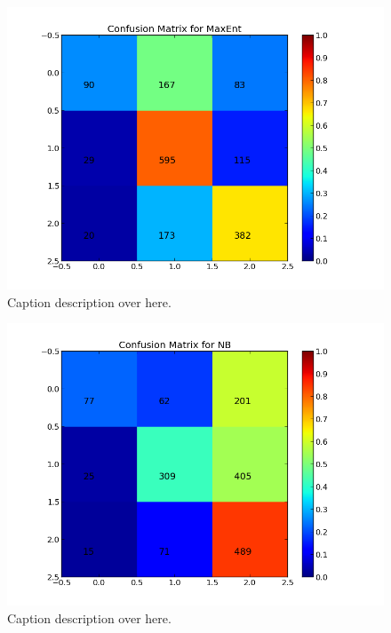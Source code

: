 \begin{figure}[ht]
 \begin{center}
     \includegraphics[width=0.7\linewidth]{../img/plots/grid/confusion_matrix_MaxEnt.png}
 \end{center}
 \caption[Results overview across models]{Caption description over here.}
 \label{fig:confmat_maxent}
\end{figure}

\begin{figure}[ht]
 \begin{center}
     \includegraphics[width=0.7\linewidth]{../img/plots/grid/confusion_matrix_NB.png}
 \end{center}
 \caption[Results overview across models]{Caption description over here.}
 \label{fig:confmat_nb}
\end{figure}

